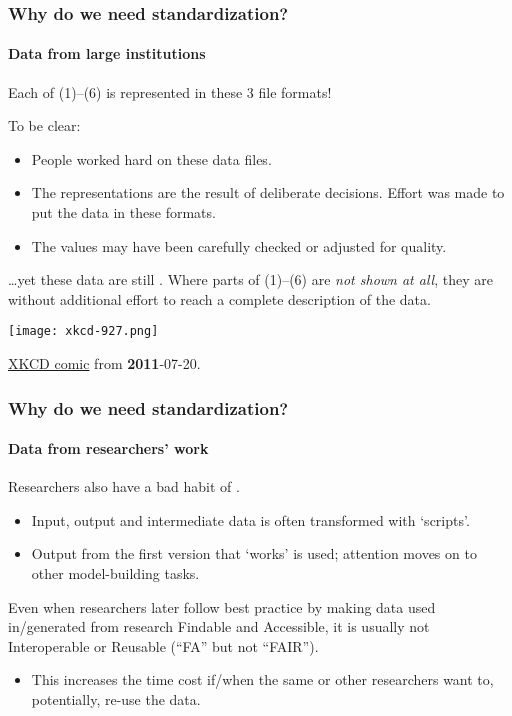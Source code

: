 \documentclass[12pt,aspectratio=169]{beamer}
\begin{document}
\begin{frame}
\frametitle{Why do we need standardization?}
\framesubtitle{Data from large institutions}

Each of (1)–(6) is represented  in these 3 file formats!

\bigskip
To be clear:
\begin{itemize}
  \item People worked hard on these data files.
  \item The representations are the result of deliberate decisions.
  Effort was made to put the data in these formats.
  \item The values may have been carefully checked or adjusted for quality.
\end{itemize}

\bigskip
…yet these data are still .
Where parts of (1)–(6) are \emph{not shown at all}, they are  without additional effort to reach a complete description of the data.
\end{frame}

\begin{frame}[plain]
\hspace*{-10mm}
\centering
\texttt{[image: xkcd-927.png]}

\href{https://xkcd.com/927}{XKCD comic} from \textbf{2011}-07-20.
\end{frame}

\begin{frame}
\frametitle{Why do we need standardization?}
\framesubtitle{Data from researchers' work}

Researchers also have a bad habit of .
\begin{itemize}
  \item Input, output and intermediate data is often transformed with ‘scripts’.
  \item Output from the first version that ‘works’ is used; attention moves on to other model-building tasks.
\end{itemize}

\medskip
Even when researchers later follow best practice by making data used in/generated from research Findable and Accessible, it is usually not Interoperable or Reusable (“FA” but not “FAIR”).
\begin{itemize}
  \item This increases the time cost if/when the same or other researchers want to, potentially, re-use the data.
\end{itemize}

\end{frame}
\end{document}
